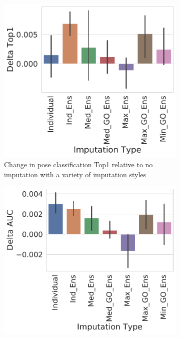 \documentclass[journal=jmcmar,manuscript=article]{achemso}
\begin{document}
\begin{figure}[tbph]
    \begin{subfigure}[t]{0.48\textwidth}
        \centering
        \includegraphics[width=\linewidth]{figures/ComparingImpStylesTop1.pdf}
        \caption{Change in pose classification Top1 relative to no imputation with a variety of imputation styles}
    \end{subfigure}
    \hfill
    \begin{subfigure}[t]{0.48\textwidth}
        \centering
        \includegraphics[width=\linewidth]{figures/ComparingImpStylesAUC.pdf}

\end{subfigure}
\end{figure}
\end{document}
